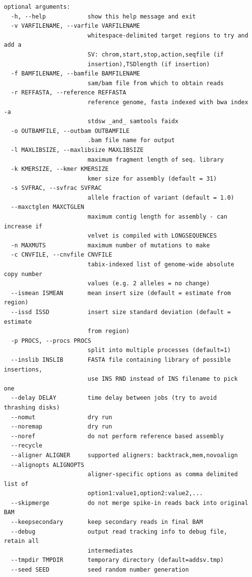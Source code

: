 \documentclass[letterpaper,11pt]{article}
\begin{document}
\begin{verbatim}
optional arguments:
  -h, --help            show this help message and exit
  -v VARFILENAME, --varfile VARFILENAME
                        whitespace-delimited target regions to try and add a
                        SV: chrom,start,stop,action,seqfile (if
                        insertion),TSDlength (if insertion)
  -f BAMFILENAME, --bamfile BAMFILENAME
                        sam/bam file from which to obtain reads
  -r REFFASTA, --reference REFFASTA
                        reference genome, fasta indexed with bwa index -a
                        stdsw _and_ samtools faidx
  -o OUTBAMFILE, --outbam OUTBAMFILE
                        .bam file name for output
  -l MAXLIBSIZE, --maxlibsize MAXLIBSIZE
                        maximum fragment length of seq. library
  -k KMERSIZE, --kmer KMERSIZE
                        kmer size for assembly (default = 31)
  -s SVFRAC, --svfrac SVFRAC
                        allele fraction of variant (default = 1.0)
  --maxctglen MAXCTGLEN
                        maximum contig length for assembly - can increase if
                        velvet is compiled with LONGSEQUENCES
  -n MAXMUTS            maximum number of mutations to make
  -c CNVFILE, --cnvfile CNVFILE
                        tabix-indexed list of genome-wide absolute copy number
                        values (e.g. 2 alleles = no change)
  --ismean ISMEAN       mean insert size (default = estimate from region)
  --issd ISSD           insert size standard deviation (default = estimate
                        from region)
  -p PROCS, --procs PROCS
                        split into multiple processes (default=1)
  --inslib INSLIB       FASTA file containing library of possible insertions,
                        use INS RND instead of INS filename to pick one
  --delay DELAY         time delay between jobs (try to avoid thrashing disks)
  --nomut               dry run
  --noremap             dry run
  --noref               do not perform reference based assembly
  --recycle
  --aligner ALIGNER     supported aligners: backtrack,mem,novoalign
  --alignopts ALIGNOPTS
                        aligner-specific options as comma delimited list of
                        option1:value1,option2:value2,...
  --skipmerge           do not merge spike-in reads back into original BAM
  --keepsecondary       keep secondary reads in final BAM
  --debug               output read tracking info to debug file, retain all
                        intermediates
  --tmpdir TMPDIR       temporary directory (default=addsv.tmp)
  --seed SEED           seed random number generation
  
\end{verbatim}
\end{document}
